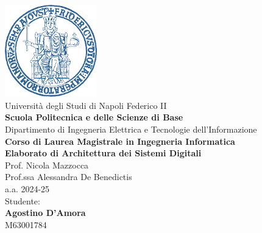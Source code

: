 \documentclass[a4paper,12pt]{report}
\begin{document}
\begin{titlepage}
\begin{center}

\includegraphics[width=0.3\textwidth]{logo_unina} \\
\vspace{1cm}
\large Università degli Studi di Napoli Federico II \\
\textbf{Scuola Politecnica e delle Scienze di Base} \\
Dipartimento di Ingegneria Elettrica e Tecnologie dell’Informazione \\
\vspace{1cm}
\LARGE \textbf{Corso di Laurea Magistrale in Ingegneria Informatica} \\
\vspace{1cm}
\Huge \textbf{Elaborato di Architettura dei Sistemi Digitali} \\
\vspace{1cm}
\large Prof. Nicola Mazzocca \\
\large Prof.ssa Alessandra De Benedictis \\
\vspace{1cm}
\large a.a. 2024-25 \\
\vspace{1cm}
\large Studente: \\
\Large \textbf{Agostino D’Amora} \\
M63001784 \\

\end{center}
\end{titlepage}

\tableofcontents



\appendix

\end{document}

